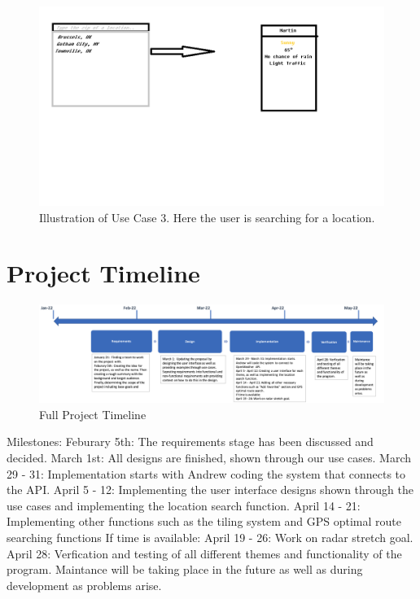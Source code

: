 \documentclass[10pt,conference,onecolumn,compsoc]{IEEEtran}
\begin{document}
\begin{figure}[ht!]
\includegraphics[scale=0.3]{use_case_3.png}
\caption{Illustration of Use Case 3. Here the user is searching for a location.}
\label{use_case_3}
\end{figure}


\section{Project Timeline}
\begin{figure}[ht !]
\includegraphics[scale = 0.5]{Timeline.png}
\caption{Full Project Timeline}
\label{TimeLine}
\end{figure}
Milestones:
Feburary 5th: The requirements stage has been discussed and decided.
March 1st: All designs are finished, shown through our use cases.
March 29 - 31: Implementation starts with Andrew coding the system that connects to the API.
April 5 - 12: Implementing the user interface designs shown through the use cases and implementing the location search function.
April 14 - 21: Implementing other functions such as the tiling system and GPS optimal route searching functions
If time is available:
April 19 - 26: Work on radar stretch goal.
April 28: Verfication and testing of all different themes and functionality of the program.
Maintance will be taking place in the future as well as during development as problems arise.
\end{document}
